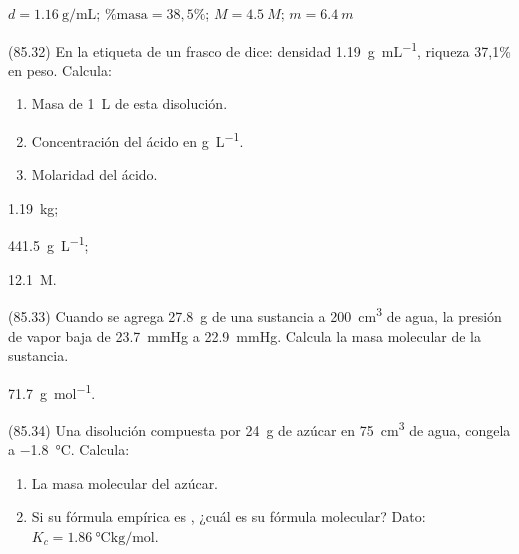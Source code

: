 \documentclass[10pt,a5paper,twoside]{article}
\begin{document}
  \begin{solution}
    \( d = \SI{1.16}{\gram\per\milli\liter} \); \( \%\textrm{masa} = 38,5\% \); \( M = \SI{4.5}{M} \); \( m = \SI{6.4}{m} \)
  \end{solution}




  \begin{exercise}[
      tags    = {},
      topics  = {química,química básica},
      source  = {FQ 1B MGH 2016, p85, e32},
    ]
    (85.32) En la etiqueta de un frasco de  dice: densidad \SI{1.19}{\gram\per\milli\liter}, riqueza 37,1\% en peso. Calcula:
    \begin{enumerate}
      \item Masa de \SI{1}{\liter} de esta disolución.
      \item Concentración del ácido en \si{\gram\per\liter}.
      \item Molaridad del ácido.
    \end{enumerate}
  \end{exercise}

  \begin{solution}
    \begin{enumerate*}
      \item \SI{1,19}{\kilo\gram};
      \item \SI{441,5}{\gram\per\liter};
      \item \SI{12,1}{M}.
    \end{enumerate*}
  \end{solution}




  \begin{exercise}[
      tags    = {},
      topics  = {química,química básica},
      source  = {FQ 1B MGH 2016, p85, e33},
    ]
    (85.33) Cuando se agrega \SI{27.8}{\gram} de una sustancia a \SI{200}{\cubic\centi\meter} de agua, la presión de vapor baja de \SI{23.7}{\mmHg} a \SI{22.9}{\mmHg}. Calcula la masa molecular de la sustancia.
  \end{exercise}

  \begin{solution}
    \SI{71.7}{\gram\per\mole}.
  \end{solution}




  \begin{exercise}[
      tags    = {},
      topics  = {química,química básica},
      source  = {FQ 1B MGH 2016, p85, e34},
    ]
    (85.34) Una disolución compuesta por \SI{24}{\gram} de azúcar en \SI{75}{\cubic\centi\meter} de agua, congela a \SI{-1.8}{\celsius}. Calcula:
    \begin{enumerate}
      \item La masa molecular del azúcar.
      \item Si su fórmula empírica es , ¿cuál es su fórmula molecular? Dato: \( K_c = \SI{1.86}{\celsius\kilo\gram\per\mole} \).
    \end{enumerate}
  \end{exercise}
\end{document}
